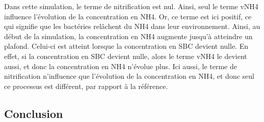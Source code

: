 \par{
Dans cette simulation, le terme de nitrification est nul. Ainsi, seul le terme vNH4 influence l'\'evolution de
la concentration en NH4. Or, ce terme est ici positif, ce qui signifie que les bact\'eries rel\^achent du NH4
dans leur environnement. Ainsi, au d\'ebut de la simulation, la concentration en NH4 augmente jusqu'\`a
atteindre un plafond. Celui-ci est atteint lorsque la concentration en SBC devient nulle. En effet, si la
concentration en SBC devient nulle, alors le terme vNH4 le devient aussi, et donc la concentration en NH4
n'\'evolue plus. Ici aussi, le terme de nitrification n'influence que l'\'evolution de la concentration en
NH4, et donc seul ce processus est diff\'erent, par rapport \`a la r\'ef\'erence.
}

\FloatBarrier
\newpage
\subsection{Conclusion}
\par{
\todo
}
